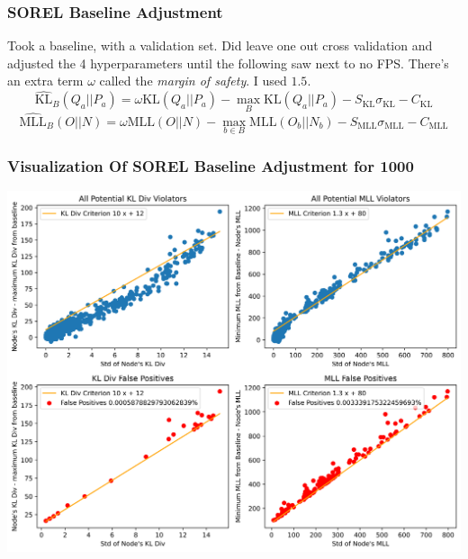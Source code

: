 \documentclass{beamer}
\begin{document}
\begin{frame}
    \frametitle{SOREL Baseline Adjustment}
    Took a baseline, with a validation set. Did leave one out cross validation and adjusted the 4 hyperparameters until the following saw next to no FPS. There's an extra term $\omega$ called the \emph{margin of safety}. I used $1.5$.
    $$ \widehat{\text{KL}}_B(Q_a|| P_a) = \omega \text{KL}(Q_a|| P_a) - \max_B \text{KL}(Q_a|| P_a) - S_{\text{KL}} \sigma_\text{KL} - C_{\text{KL}}$$
    $$ \widehat{\text{MLL}}_B(O|| N) = \omega \text{MLL}(O|| N)  - \max_{b \in B} \text{MLL}(O_b|| N_b) - S_{\text{MLL}} \sigma_\text{MLL} - C_{\text{MLL}}$$
\end{frame}

\begin{frame}
    \frametitle{Visualization Of SOREL Baseline Adjustment for 1000}
    \begin{center}
        \includegraphics[scale=0.4]{1000_violators.png}
    \end{center}
\end{frame}
\end{document}
